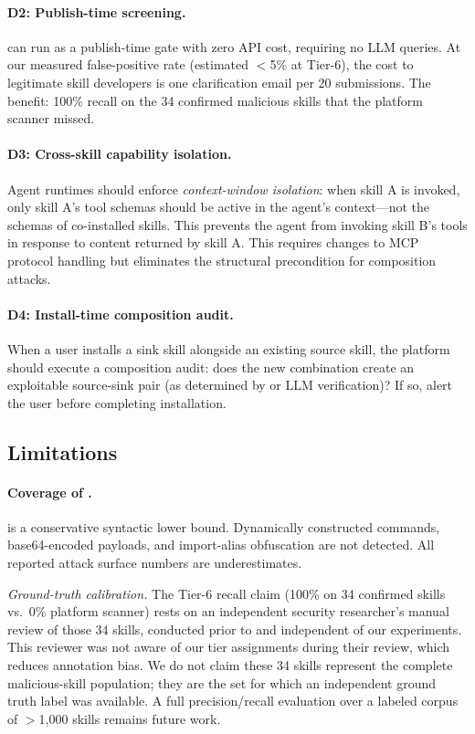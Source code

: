 \paragraph{D2: Publish-time \lscps screening.}
\lscps can run as a publish-time gate with zero API cost,
requiring no LLM queries.
At our measured false-positive rate (estimated $<$5\% at Tier-6),
the cost to legitimate skill developers is one clarification email
per 20 submissions.
The benefit: 100\% recall on the 34 confirmed malicious skills
that the platform scanner missed.

\paragraph{D3: Cross-skill capability isolation.}
Agent runtimes should enforce \emph{context-window isolation}:
when skill A is invoked, only skill A's tool schemas should be
active in the agent's context---not the schemas of co-installed skills.
This prevents the agent from invoking skill B's tools in
response to content returned by skill A.
This requires changes to MCP protocol handling
but eliminates the structural precondition for composition attacks.

\paragraph{D4: Install-time composition audit.}
When a user installs a sink skill alongside an existing source skill,
the platform should execute a composition audit:
does the new combination create an exploitable source-sink pair
(as determined by \lscps or LLM verification)?
If so, alert the user before completing installation.

\subsection{Limitations}

\paragraph{Coverage of \lscps.}
\lscps is a conservative syntactic lower bound.
Dynamically constructed commands, base64-encoded payloads,
and import-alias obfuscation are not detected.
All reported attack surface numbers are underestimates.

\noindent\emph{Ground-truth calibration.}
The Tier-6 recall claim (100\% on 34 confirmed skills vs.\ 0\% platform scanner)
rests on an independent security researcher's manual review of those 34 skills,
conducted prior to and independent of our experiments.
This reviewer was not aware of our tier assignments during their review,
which reduces annotation bias.
We do not claim these 34 skills represent the complete malicious-skill population;
they are the set for which an independent ground truth label was available.
A full precision/recall evaluation over a labeled corpus of $>$1,000 skills
remains future work.

